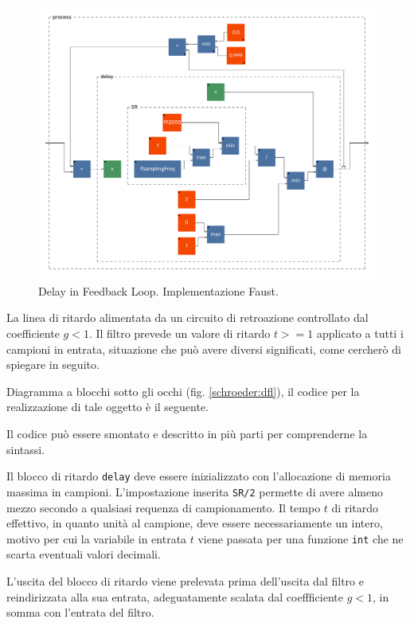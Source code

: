 \begin{refsection}
\begin{figure}[t!]
  \centering
  \includegraphics[width=\textwidth]{CAPITOLI/0500/CODES/REV/dfl-svg/process.pdf}
  \caption[]{Delay in Feedback Loop. Implementazione Faust.}
  \label{faust:dfl}
\end{figure}

La linea di ritardo alimentata da un circuito di retroazione controllato dal
coefficiente $g < 1$.  Il filtro prevede un valore di ritardo $t >= 1$ applicato a
tutti i campioni in entrata, situazione che può avere diversi significati,
come cercherò di spiegare in seguito.

Diagramma a blocchi sotto gli occhi (fig. \ref{schroeder:dfl}), il codice \faust
per la realizzazione di tale oggetto è il seguente.



Il codice può essere smontato e descritto in più parti per comprenderne la sintassi.

Il blocco di ritardo \texttt{delay} deve essere inizializzato con l'allocazione
di memoria massima in campioni. L'impostazione inserita \texttt{SR/2} permette
di avere almeno mezzo secondo a qualsiasi requenza di campionamento. Il tempo
$t$ di ritardo effettivo, in quanto unità al campione, deve essere necessariamente
un intero, motivo per cui la variabile in entrata $t$ viene passata per una
funzione \texttt{int} che ne scarta eventuali valori decimali.

L'uscita del blocco di ritardo viene prelevata prima dell'uscita dal filtro e
reindirizzata alla sua entrata, adeguatamente scalata dal coeffficiente $g < 1$,
in somma con l'entrata del filtro.


\end{refsection}
